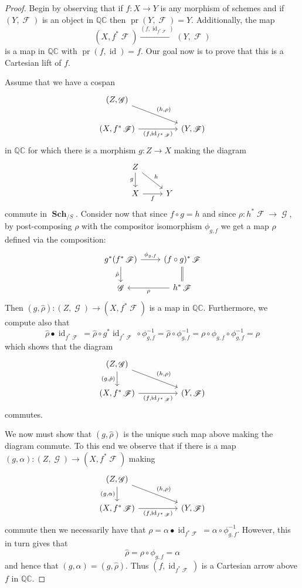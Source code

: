 \documentclass{amsart}
\theoremstyle{definition}
\DeclareMathOperator{\Fscr}{\mathscr{F}}
\DeclareMathOperator{\Gscr}{\mathscr{G}}
\DeclareMathOperator{\id}{id}
\DeclareMathOperator{\Sch}{\mathbf{Sch}}
\DeclareMathOperator{\pr}{pr}
\numberwithin{equation}{subsection}
\begin{document}
\begin{proof}
Begin by observing that if $f:X \to Y$ is any morphism of schemes and if $(Y,\Fscr)$ is an object in $\mathbb{QC}$ then $\pr(Y,\Fscr) = Y$. Additionally, the map
\[
(X,f^{\ast}\Fscr) \xrightarrow{(f,\id_{f^{\ast}\Fscr})} (Y,\Fscr)
\]
is a map in $\mathbb{QC}$ with $\pr(f,\id) = f$. Our goal now is to prove that this is a Cartesian lift of $f$.

Assume that we have a cospan
\[
\begin{tikzcd}
(Z,\Gscr) \ar[drr]{}{(h,\rho)} \\
(X,f^{\ast}\Fscr) \ar[rr, swap]{}{(f,\id_{f^{\ast}\Fscr})} & & (Y,\Fscr)
\end{tikzcd}
\]
in $\mathbb{QC}$ for which there is a morphism $g:Z \to X$ making the diagram
\[
\begin{tikzcd}
Z \ar[dr]{}{h} \ar[d, swap]{}{g} \\
X \ar[r, swap]{}{f} & Y
\end{tikzcd}
\]
commute in $\Sch_{/S}$. Consider now that since $f \circ g = h$ and since $\rho:h^{\ast}\Fscr \to \Gscr$, by post-composing $\rho$ with the compositor isomorphism $\phi_{g,f}$ we get a map $\hat{\rho}$ defined via the composition:
\[
\begin{tikzcd}
g^{\ast}(f^{\ast}\Fscr) \ar[d, swap]{}{\hat{\rho}} \ar[r]{}{\phi_{g,f}} & (f \circ g)^{\ast}\Fscr \ar[d, equals] \\
\Gscr & h^{\ast}\Fscr \ar[l]{}{\rho} 
\end{tikzcd}
\]
Then $(g,\hat{\rho}):(Z,\Gscr) \to (X,f^{\ast}\Fscr)$ is a map in $\mathbb{QC}$. Furthermore, we compute also that
\[
\hat{\rho} \bullet \id_{f^{\ast}\Fscr} = \hat{\rho} \circ g^{\ast}\id_{f^{\ast}\Fscr} \circ \phi_{g,f}^{-1} = \hat{\rho} \circ \phi_{g,f}^{-1} = \rho \circ \phi_{g,f} \circ \phi_{g,f}^{-1} = \rho 
\]
which shows that the diagram
\[
\begin{tikzcd}
	(Z,\Gscr) \ar[drr]{}{(h,\rho)} \ar[d, swap]{}{(g,\hat{\rho})} \\
	(X,f^{\ast}\Fscr) \ar[rr, swap]{}{(f,\id_{f^{\ast}\Fscr})} & & (Y,\Fscr)
\end{tikzcd}
\]
commutes.

We now must show that $(g,\hat{\rho})$ is the unique such map above making the diagram commute. To this end we observe that if there is a map $(g,\alpha):(Z,\Gscr) \to (X,f^{\ast}\Fscr)$ making
\[
\begin{tikzcd}
	(Z,\Gscr) \ar[drr]{}{(h,\rho)} \ar[d, swap]{}{(g,\alpha)} \\
	(X,f^{\ast}\Fscr) \ar[rr, swap]{}{(f,\id_{f^{\ast}\Fscr})} & & (Y,\Fscr)
\end{tikzcd}
\]
commute then we necessarily have that $\rho = \alpha \bullet \id_{f^{\ast}\Fscr} = \alpha \circ \phi_{g,f}^{-1}$. However, this in turn gives that
\[
\hat{\rho} = \rho \circ \phi_{g,f} = \alpha
\]
and hence that $(g,\alpha) = (g,\hat{\rho})$. Thus $(f,\id_{f^{\ast}\Fscr})$ is a Cartesian arrow above $f$ in $\mathbb{QC}$.
\end{proof}
\end{document}
